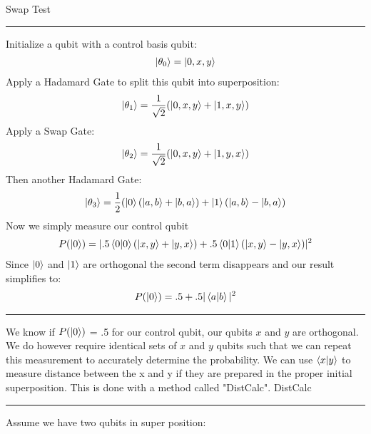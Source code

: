 \documentclass[conference]{IEEEtran}
\begin{document}
\newline
{\large Swap Test} \newline
\noindent\rule{\columnwidth}{1pt}
\newline
   Initialize a qubit with a control basis qubit: \newline 
 \begin{align*}
 \ket{\theta_0} = \ket{0,x,y} 
 \end{align*} 
   Apply a Hadamard Gate to split this qubit into superposition: \newline
 \begin{align*}
 \ket{\theta_1} = \frac{1}{\sqrt{2}}(\ket{0,x,y}+ \ket{1,x,y}) 
 \end{align*} 
   Apply a Swap Gate: \newline 
 \begin{align*} 
 \ket{\theta_2} = \frac{1}{\sqrt{2}}(\ket{0,x,y}+ \ket{1,y,x}) 
 \end{align*} 
   Then another Hadamard Gate: \newline 
 \begin{align*}
 \ket{\theta_3} = \frac{1}{2}(\ket{0}(\ket{a,b}+\ket{b,a}) + \ket{1}(\ket{a,b}-\ket{b,a}) 
 \end{align*} 
 Now we simply measure our control qubit \newline
 \begin{align*}
 P(\ket{0}) =|.5 \bra{0}\ket{0}(\ket{x,y} + \ket{y,x}) + .5\bra{0}\ket{1}(\ket{x,y}-\ket{y,x})|^2
 \end{align*}
 Since $\ket{0}$ and $\ket{1}$ are orthogonal the second term disappears and our result simplifies to: \newline
 \begin{align*}
 P(\ket{0}) = .5 + .5|\bra{a}\ket{b}|^2
 \end{align*} \newline
\noindent\rule{\columnwidth}{1pt}
\indent We know if $P(\ket{0})$ = .5 for our control qubit, our qubits $x$ and $y$ are orthogonal. We do however require identical sets of $x$ and $y$ qubits such that we can repeat this measurement to accurately determine the probability. We can use $\bra{x}\ket{y}$ to measure distance between the x and y if they are prepared in the proper initial superposition. This is done with a method called "DistCalc".  \newline
\newline
{\large DistCalc} \newline
\noindent\rule{\columnwidth}{1pt}
Assume we have two qubits in super position:
\end{document}
